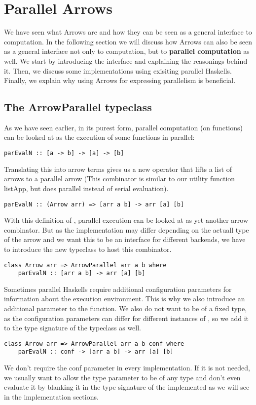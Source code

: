 \section{Parallel Arrows}
We have seen what Arrows are and how they can be seen as a general interface to computation. In the following section we will discuss how Arrows can also be seen as a general interface not only to computation, but to \textbf{parallel computation} as well. We start by introducing the interface and explaining the reasonings behind it. Then, we discuss some implementations using exisiting parallel Haskells. Finally, we explain why using Arrows for expressing parallelism is beneficial.
\subsection{The ArrowParallel typeclass}
As we have seen earlier, in its purest form, parallel computation (on functions) can be looked at as the execution of some functions  in parallel:
\begin{lstlisting}[frame=htrbl]
parEvalN :: [a -> b] -> [a] -> [b]
\end{lstlisting}
Translating this into arrow terms gives us a new operator  that lifts a list of arrows \code{[arr a b]} to a parallel arrow  (This combinator is similar to our utility function listApp, but does parallel instead of serial evaluation).
\begin{lstlisting}[frame=htrbl]
parEvalN :: (Arrow arr) => [arr a b] -> arr [a] [b]
\end{lstlisting}
With this definition of , parallel execution can be looked at as yet another arrow combinator. But as the implementation may differ depending on the actuall type of the arrow  and we want this to be an interface for different backends, we have to introduce the new typeclass  to host this combinator.
\begin{lstlisting}[frame=htrbl]
class Arrow arr => ArrowParallel arr a b where
	parEvalN :: [arr a b] -> arr [a] [b]
\end{lstlisting}
Sometimes parallel Haskells require additional configuration parameters for information about the execution environment. This is why we also introduce an additional  parameter to the function. We also do not want  to be of a fixed type, as the configuration parameters can differ for different instances of , so we add it to the type signature of the typeclass as well.
\begin{lstlisting}[frame=htrbl]
class Arrow arr => ArrowParallel arr a b conf where
	parEvalN :: conf -> [arr a b] -> arr [a] [b]
\end{lstlisting}
We don't require the conf parameter in every implementation. If it is not needed, we usually want to allow the  type parameter to be of any type and don't even evaluate it by blanking it in the type signature of the implemented  as we will see in the implementation sections.

